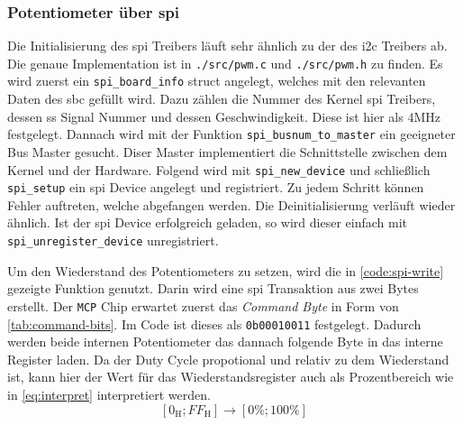 \subsubsection{Potentiometer über \acrshort{spi}}

Die Initialisierung des \gls{spi} Treibers läuft sehr ähnlich zu der des \gls{i2c} Treibers ab.
Die genaue Implementation ist in \texttt{./src/pwm.c} und \texttt{./src/pwm.h} zu finden.
Es wird zuerst ein \texttt{spi\_board\_info} struct angelegt, welches mit den relevanten Daten des \gls{sbc} gefüllt wird.
Dazu zählen die Nummer des Kernel \gls{spi} Treibers, dessen \gls{ss} Signal Nummer und dessen Geschwindigkeit.
Diese ist hier als $4\si{\mega\hertz}$ festgelegt.
Dannach wird mit der Funktion \texttt{spi\_busnum\_to\_master} ein geeigneter Bus Master gesucht.
Diser Master implementiert die Schnittstelle zwischen dem Kernel und der Hardware.
Folgend wird mit \texttt{spi\_new\_device} und schließlich \texttt{spi\_setup} ein \gls{spi} Device angelegt und registriert.
Zu jedem Schritt können Fehler auftreten, welche abgefangen werden.
Die Deinitialisierung verläuft wieder ähnlich.
Ist der \gls{spi} Device erfolgreich geladen, so wird dieser einfach mit \texttt{spi\_unregister\_device} unregistriert.

Um den Wiederstand des Potentiometers zu setzen, wird die in \autoref{code:spi-write} gezeigte Funktion genutzt.
Darin wird eine \gls{spi} Transaktion aus zwei Bytes erstellt.
Der \texttt{MCP} Chip erwartet zuerst das \textit{Command Byte} in Form von \autoref{tab:command-bits}.
Im Code ist dieses als \texttt{0b00010011} festgelegt.
Dadurch werden beide internen Potentiometer das dannach folgende Byte in das interne Register laden.
Da der Duty Cycle propotional und relativ zu dem Wiederstand ist, kann hier der Wert für das Wiederstandsregister auch als Prozentbereich wie in \autoref{eq:interpret} interpretiert werden.
\begin{equation}
    \left[0_{\text{H}}; FF_{\text{H}}\right] \rightarrow \left[0\%; 100\%\right]
    \label{eq:interpret}
\end{equation}



